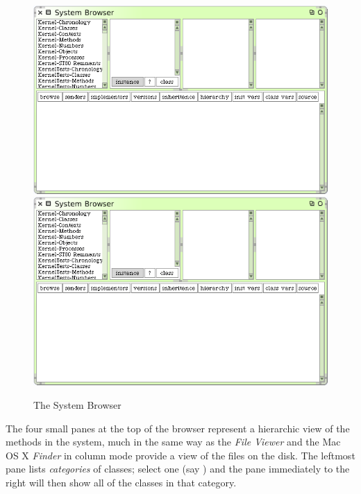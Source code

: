 \documentclass[a4paper,10pt,twoside]{book}
\begin{document}
\begin{figure}[htbp]
   \centering
   \ifluluelse
	 {\includegraphics[width=\textwidth]{SystemBrowser0} }
	 {\includegraphics[scale=.7]{SystemBrowser0} }
   \caption{The System Browser}
   \label{fig:SystemBrowser0}
\end{figure}

The four small panes at the top of the browser represent a hierarchic view of the methods in the system, much in the same way as the  \textit{File Viewer} and the Mac OS X \textit{Finder} in column mode provide a view of the files on the disk.
The leftmost pane lists \emph{categories} of classes; select one (say ) and the pane immediately to the right will then show all of the classes in that category.
\end{document}
